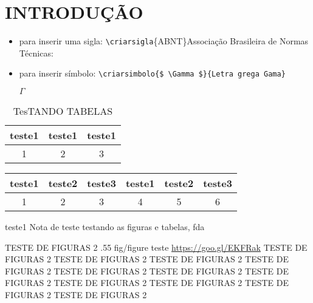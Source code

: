 \chapter[INTRODUÇÃO]{INTRODUÇÃO}


\cite{ISO5122:1979}

\textcite{ISO5122:1979}

\begin{itemize}
 \item para inserir uma sigla: 
    \verb|\criarsigla|\{ABNT\}{Associa\c{c}\~ao Brasileira de Normas T\'ecnicas}:


\item para inserir s\'imbolo: 
    \verb|\criarsimbolo{$ \Gamma $}{Letra grega Gama}|
  
    $ \Gamma $ 

\end{itemize}

\begin{table}[!ht]
 \centering
 \par\caption{TesTANDO TABELAS}

\begin{tabular}{c|c|c}
 teste1&teste1&teste1\\\hline\hline
  1&2&3\\\hline
 \end{tabular}
 \label{tab:tab01}
\end{table}



{
\begin{tabular}{c|c|c|c|c|c}
 teste1&teste2&teste3&teste1&teste2&teste3\\\hline\hline
  1&2&3&4&5&6\\\hline
 \end{tabular}
} %
{\textcite{ISO5122:1979}}%
{teste1} %
{ Nota de teste } %
{testando as figuras e tabelas, fda} %


\figura
{TESTE DE FIGURAS 2} %
{.55} %
{fig/figure} %
{\textcite[1]{abntex2modelo}} %
{teste} %
{\url{https://goo.gl/EKFRak} TESTE DE FIGURAS 2 TESTE DE FIGURAS 2 TESTE DE FIGURAS 2 TESTE DE FIGURAS 2 TESTE DE FIGURAS 2 TESTE DE FIGURAS 2 TESTE DE FIGURAS 2 TESTE DE FIGURAS 2 TESTE DE FIGURAS 2 TESTE DE FIGURAS 2 TESTE DE FIGURAS 2} %
{} %

